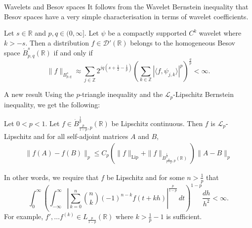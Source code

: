 \documentclass{beamer}
\numberwithin{equation}{section}
\theoremstyle{plain}
\theoremstyle{plain}
\theoremstyle{definition}
\theoremstyle{plain}
\theoremstyle{plain}
\theoremstyle{definition}
\newcommand{\Rl}{\mathbb{R}}
\newcommand{\Itgr}{\mathbb{Z}}
\newcommand{\Dc}{\mathcal{D}}
\newcommand{\Lc}{\mathcal{L}}
\begin{document}
\begin{frame}{Wavelets and Besov spaces}
    It follows from the Wavelet Bernstein inequality that Besov spaces have a very simple characterisation in terms of wavelet coefficients.
    \begin{theorem}[Meyer (1986)]
        Let $s \in \Rl$ and $p,q\in (0,\infty].$ Let $\psi$ be a compactly supported $C^k$ wavelet where $k > -s.$ Then a distribution $f\in \Dc'(\Rl)$
        belongs to the homogeneous Besov space $\dot{B}^{s}_{p,q}(\Rl)$ if and only if
        \begin{equation*}
            \|f\|_{B^s_{p,q}}\approx \sum_{j\in \Itgr} 2^{jq(s+\frac{1}{2}-\frac{1}{p})}\left(\sum_{k\in \Itgr} |\langle f,\psi_{j,k}\rangle|^p\right)^{\frac{q}{p}} < \infty.
        \end{equation*}
    \end{theorem}
\end{frame}



\begin{frame}{A new result}
    Using the $p$-triangle inequality and the $\Lc_p$-Lipschitz Bernstein inequality, we get the following:
    \begin{theorem}
        Let $0 < p < 1.$ Let $f \in \dot{B}^{\frac1p}_{\frac{p}{1-p},p}(\Rl)$ be Lipschitz continuous. Then $f$ is $\Lc_p$-Lipschitz and
        for all self-adjoint matrices $A$ and $B$,
        \begin{align*}
            \|f(A)-f(B)\|_p \leq C_{p}(\|f\|_{\mathrm{Lip}}+\|f\|_{\dot{B}^{\frac1p}_{\frac{p}{1-p},p}(\Rl)})\|A-B\|_p
        \end{align*}
    \end{theorem}
    \pause
    In other words, we require that $f$ be Lipschitz and for some $n>\frac1p$ that
    \begin{equation*}
        \int_0^\infty \left(\int_{-\infty}^\infty \left|\sum_{k=0}^n \binom{n}{k}(-1)^{n-k}f(t+kh)\right|^{\frac{p}{1-p}}\,dt\right)^{1-p} \frac{dh}{h^2} < \infty.
    \end{equation*}
    \pause
    For example, $f',\ldots f^{(k)} \in L_{\frac{p}{1-p}}(\Rl)$ where $k > \frac{1}{p}-1$ is sufficient.
\end{frame}
\end{document}
